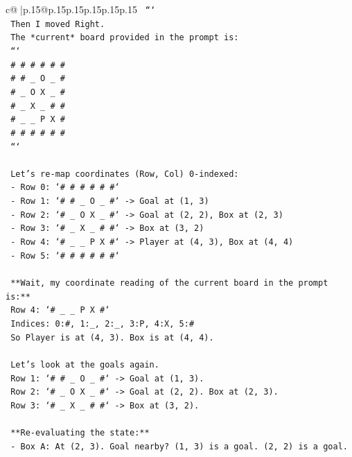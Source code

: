 \documentclass{article}
\begin{document}
{\begin{supertabular}{c@{$\;$}|p{.15\linewidth}@{}p{.15\linewidth}p{.15\linewidth}p{.15\linewidth}p{.15\linewidth}p{.15\linewidth}}
{{{\texttt{   ```} \\
\texttt{   Then I moved Right.} \\
\texttt{   The *current* board provided in the prompt is:} \\
\texttt{   ```} \\
\texttt{   \# \# \# \# \# \#} \\
\texttt{   \# \# \_ O \_ \#} \\
\texttt{   \# \_ O X \_ \#} \\
\texttt{   \# \_ X \_ \# \#} \\
\texttt{   \# \_ \_ P X \#} \\
\texttt{   \# \# \# \# \# \#} \\
\texttt{   ```} \\
\\ 
\texttt{   Let's re{-}map coordinates (Row, Col) 0{-}indexed:} \\
\texttt{   {-} Row 0: `\# \# \# \# \# \#`} \\
\texttt{   {-} Row 1: `\# \# \_ O \_ \#` {-}> Goal at (1, 3)} \\
\texttt{   {-} Row 2: `\# \_ O X \_ \#` {-}> Goal at (2, 2), Box at (2, 3)} \\
\texttt{   {-} Row 3: `\# \_ X \_ \# \#` {-}> Box at (3, 2)} \\
\texttt{   {-} Row 4: `\# \_ \_ P X \#` {-}> Player at (4, 3), Box at (4, 4)} \\
\texttt{   {-} Row 5: `\# \# \# \# \# \#`} \\
\\ 
\texttt{   **Wait, my coordinate reading of the current board in the prompt is:**} \\
\texttt{   Row 4: `\# \_ \_ P X \#`} \\
\texttt{   Indices: 0:\#, 1:\_, 2:\_, 3:P, 4:X, 5:\#} \\
\texttt{   So Player is at (4, 3). Box is at (4, 4).} \\
\\ 
\texttt{   Let's look at the goals again.} \\
\texttt{   Row 1: `\# \# \_ O \_ \#` {-}> Goal at (1, 3).} \\
\texttt{   Row 2: `\# \_ O X \_ \#` {-}> Goal at (2, 2). Box at (2, 3).} \\
\texttt{   Row 3: `\# \_ X \_ \# \#` {-}> Box at (3, 2).} \\
\\ 
\texttt{   **Re{-}evaluating the state:**} \\
\texttt{   {-} Box A: At (2, 3). Goal nearby? (1, 3) is a goal. (2, 2) is a goal.} \\
}}}
\end{supertabular}}
\end{document}
